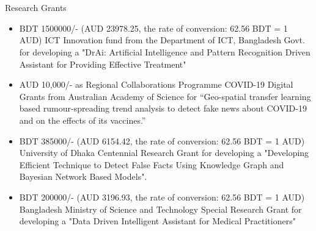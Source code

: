 \section{\faMoney}{Research Grants}

\begin{itemize}[noitemsep]
    \item BDT 1500000/- (AUD 23978.25, the rate of conversion: 62.56 BDT = 1 AUD) 
ICT Innovation fund from the Department of ICT, Bangladesh Govt. for developing a "DrAi: Artificial Intelligence and Pattern Recognition Driven Assistant for Providing Effective Treatment"
    \item AUD 10,000/- as Regional Collaborations Programme COVID-19 Digital Grants from Australian Academy of Science for “Geo-spatial transfer learning based rumour-spreading trend analysis to detect fake news about COVID-19 and on the effects of its vaccines.”
    \item BDT 385000/- (AUD 6154.42, the rate of conversion: 62.56 BDT = 1 AUD) 
University of Dhaka Centennial Research Grant for developing a "Developing Efficient Technique to Detect False Facts Using Knowledge Graph and Bayesian Network Based Models". 
    \item BDT 200000/- (AUD 3196.93, the rate of conversion: 62.56 BDT = 1 AUD)
Bangladesh Ministry of Science and Technology Special Research Grant for developing a "Data Driven Intelligent Assistant for Medical Practitioners"

\end{itemize}